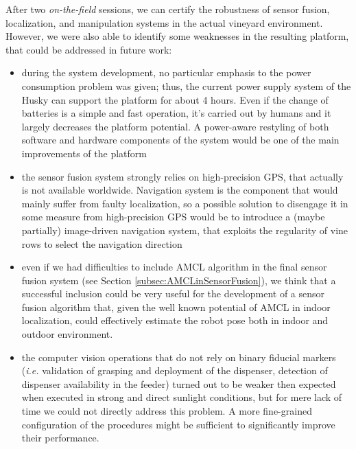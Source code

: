 After two \textit{on-the-field} sessions, we can certify the robustness of sensor fusion, localization, and manipulation systems in the actual vineyard environment. However, we were also able to identify some weaknesses in the resulting platform, that could be addressed in future work:
\begin{itemize}
	\item during the system development, no particular emphasis to the power consumption problem was given; thus, the current power supply system of the Husky can support the platform for about 4 hours. Even if the change of batteries is a simple and fast operation, it's carried out by humans and it largely decreases the platform potential. A power-aware restyling of both software and hardware components of the system would be one of the main improvements of the platform
	\item the sensor fusion system strongly relies on high-precision GPS, that actually is not available worldwide. Navigation system is the component that would mainly suffer from faulty localization, so a possible solution to disengage it in some measure from high-precision GPS would be to introduce a (maybe partially) image-driven navigation system, that exploits the regularity of vine rows to select the navigation direction
	\item even if we had difficulties to include \ac{AMCL} algorithm in the final sensor fusion system (see Section \ref{subsec:AMCLinSensorFusion}), we think that a successful inclusion could be very useful for the development of a sensor fusion algorithm that, given the well known potential of \ac{AMCL} in indoor localization, could effectively estimate the robot pose both in indoor and outdoor environment.
	\item the computer vision operations that do not rely on binary fiducial markers (\textit{i.e.} validation of grasping and deployment of the dispenser, detection of dispenser availability in the feeder) turned out to be weaker then expected when executed in strong and direct sunlight conditions, but for mere lack of time we could not directly address this problem. A more fine-grained configuration of the procedures might be sufficient to significantly improve their performance.
\end{itemize}






